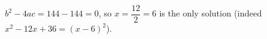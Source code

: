 $b^2-4ac=144-144=0$, so $x=\dfrac{12}{2}=\boxed{6}$ is the only solution (indeed $x^2-12x+36=(x-6)^2$).

